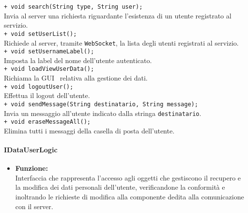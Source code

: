 {{\begin{sloppypar}
{{{\begin{itemize}
					\texttt{+ void search(String type, String user);}\\
					Invia al server una richiesta riguardante l'esistenza di un utente registrato al servizio.\\

					\texttt{+ void setUserList();}\\
					Richiede al server\g, tramite \texttt{WebSocket}, la lista degli utenti registrati al servizio.\\
					
					\texttt{+ void setUsernameLabel();}\\
					Imposta la label del nome dell'utente autenticato.\\
					
					\texttt{+ void loadViewUserData();}\\
					Richiama la GUI\g~ relativa alla gestione dei dati.\\
					
					\texttt{+ void logoutUser();}\\
					Effettua il logout dell'utente.\\
					
					\texttt{+ void sendMessage(String destinatario, String message);}\\
					Invia un messaggio all'utente indicato dalla stringa \texttt{destinatario}.\\
					 
					\texttt{+ void eraseMessageAll();}\\
					Elimina tutti i messaggi della casella di posta dell'utente.\\	
			\end{itemize}
			}
		

			\paragraph{IDataUserLogic}\label{par:IDataUserLogic}{
			\begin{itemize}
			
				\item[] \textbf{Funzione:}\\
					Interfaccia che rappresenta l'accesso agli oggetti che gestiscono il recupero e la modifica dei dati personali dell'utente, verificandone la conformità e inoltrando le richieste di modifica alla componente dedita alla comunicazione con il server\g.\\
			

\end{itemize}}}}
\end{sloppypar}}}
